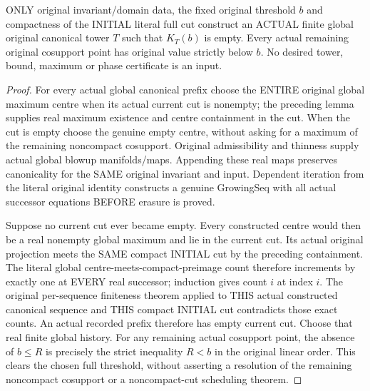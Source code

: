 \begin{theorem}
\label{hir:original-compact-upper-cut-actual-global-erasure-phase}
\leanok
ONLY original invariant/domain data, the fixed original threshold $b$ and
compactness of the INITIAL literal full cut construct an ACTUAL finite
global original canonical tower $T$ such that $K_T(b)$ is empty. Every actual
remaining original cosupport point has original value strictly below $b$.
No desired tower, bound, maximum or phase certificate is an input.
\end{theorem}
\begin{proof}
For every actual global canonical prefix choose the ENTIRE original global
maximum centre when its actual current cut is nonempty; the preceding
lemma supplies real maximum existence and centre containment in the cut.
When the cut is empty choose the genuine empty centre, without asking for
a maximum of the remaining noncompact cosupport. Original admissibility
and thinness supply actual global blowup manifolds/maps. Appending these
real maps preserves canonicality for the SAME original invariant and input.
Dependent iteration from the literal original identity constructs a genuine
GrowingSeq with all actual successor equations BEFORE erasure is proved.

Suppose no current cut ever became empty. Every constructed centre would
then be a real nonempty global maximum and lie in the current cut. Its
actual original projection meets the SAME compact INITIAL cut by the
preceding containment. The literal global centre-meets-compact-preimage
count therefore increments by exactly one at EVERY real successor; induction
gives count $i$ at index $i$. The original per-sequence finiteness theorem
applied to THIS actual constructed canonical sequence and THIS compact
INITIAL cut contradicts those exact counts. An actual recorded prefix
therefore has empty current cut. Choose that real finite global history.
For any remaining actual cosupport point, the absence of $b\le R$ is
precisely the strict inequality $R<b$ in the original linear order. This
clears the chosen full threshold, without asserting a resolution of the
remaining noncompact cosupport or a noncompact-cut scheduling theorem.
\end{proof}

